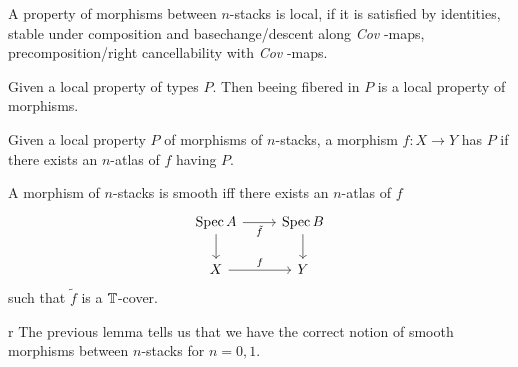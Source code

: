 \documentclass{article}
\newcommand{\Cov}{\emph{Cov} }
\begin{document}
\begin{definition}
    A property of morphisms between $n$-stacks is local, if it is satisfied by identities, stable under composition and basechange/descent along \Cov-maps, precomposition/right cancellability with \Cov-maps.
\end{definition}
\begin{lemma}
    Given a local property of types $P$. Then beeing fibered in $P$ is a local property of morphisms.
\end{lemma}
\begin{lemma}[\todocite]
    Given a local property $P$ of morphisms of $n$-stacks, a morphism $f : X \to Y$ has $P$ if there exists an $n$-atlas of $f$ having $P$.
\end{lemma}
\begin{example}
    A morphism of $n$-stacks is smooth iff there exists an $n$-atlas of $f$ 
\[\begin{tikzcd}
	{\Spec A} & {\Spec B} \\
	X & Y
	\arrow["{\tilde f}"', from=1-1, to=1-2]
	\arrow[from=1-1, to=2-1]
	\arrow[from=1-2, to=2-2]
	\arrow["f", from=2-1, to=2-2]
\end{tikzcd}\]
such that $\tilde f$ is a $\mathbb{T}$-cover.
\end{example}r
The previous lemma tells us that we have the correct notion of smooth morphisms between  $n$-stacks for $n = 0,1$.
\end{document}
